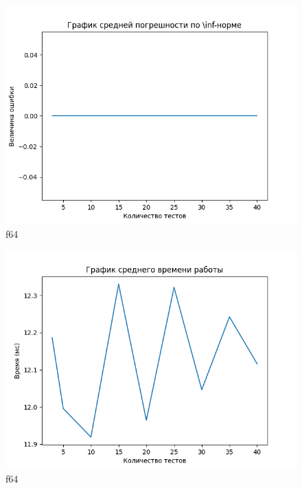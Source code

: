 \documentclass[12pt]{article}
\begin{document}
	\begin{figure}[h]
		\centering
		\includegraphics[width=16cm]{"../plots/plot-total-t2-f64.png"}
		\caption{f64}
		\label{fig:t-t2-f64}
	\end{figure}
	
	\begin{figure}[h]
		\centering
		\includegraphics[width=16cm]{"../plots/plot-total-t3-f64.png"}
		\caption{f64}
		\label{fig:t-t3-f64}
	\end{figure}
	
\end{document}
